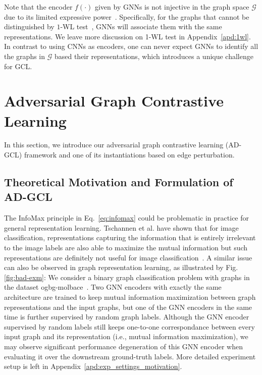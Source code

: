 Note that the encoder $f(\cdot)$ given by GNNs is not injective in the graph space $\mathcal{G}$ due to its limited expressive power~\cite{xu2018powerful,morris2019weisfeiler}. Specifically, for the graphs that cannot be distinguished by $1$-WL test~\cite{weisfeiler1968reduction}, GNNs will associate them with the same representations. We leave more discussion on 1-WL test in Appendix~\ref{apd:1wl}. In contrast to using CNNs as encoders, one can never expect GNNs to identify all the graphs in $\mathcal{G}$ based their representations, which introduces a unique challenge for GCL. 
\vspace{-3mm}
\section{Adversarial Graph Contrastive Learning}
\vspace{-2mm}
In this section, we introduce our adversarial graph contrastive learning (AD-GCL) framework and one of its instantiations based on edge perturbation. 
\vspace{-3mm}
\subsection{Theoretical Motivation and Formulation of AD-GCL}
\vspace{-1mm}
\label{sec:ad-gcl}

The InfoMax principle in Eq.~\ref{eq:infomax} could be problematic in practice for general representation learning. Tschannen et al. have shown that for image classification, representations capturing the information that is entirely irrelevant to the image labels are also able to maximize the mutual information but such representations are definitely not useful for image classification~\cite{tschannen2019mutual}. A similar issue can also be observed 
in graph representation learning, as illustrated by Fig.\ref{fig:bad-exm}: We consider a binary graph classification problem with graphs in the dataset ogbg-molbace~\cite{hu2020open}. Two GNN encoders with exactly the same architecture are trained to keep mutual information maximization between graph representations and the input graphs, but one of the GNN encoders in the same time is further supervised by random graph labels. Although the GNN encoder supervised by random labels still keeps one-to-one correspondance between every input graph and its representation (i.e., mutual information maximization), we may observe significant performance degeneration of this GNN encoder when evaluating it over the downstream ground-truth labels.  
More detailed experiment setup is left in Appendix~\ref{apd:exp_settings_motivation}. %


